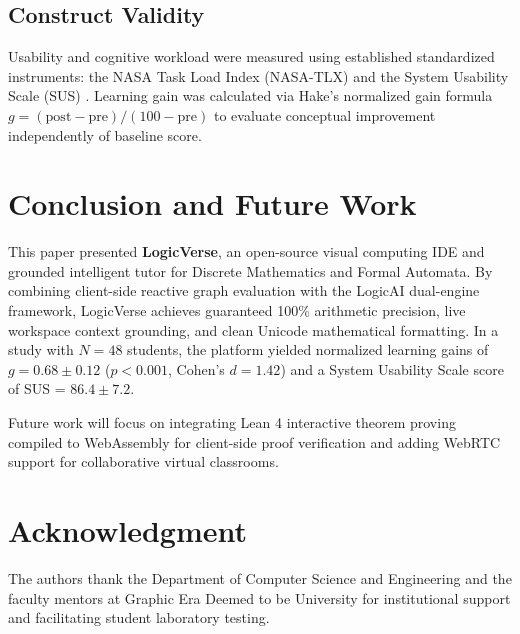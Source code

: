 \documentclass[conference]{IEEEtran}
\begin{document}
\subsection{Construct Validity}
Usability and cognitive workload were measured using established standardized instruments: the NASA Task Load Index (NASA-TLX) \cite{hart1988nasa} and the System Usability Scale (SUS) \cite{brooke1996sus}. Learning gain was calculated via Hake's normalized gain formula $g = (\text{post} - \text{pre}) / (100 - \text{pre})$ to evaluate conceptual improvement independently of baseline score.

\section{Conclusion and Future Work}
This paper presented \textbf{LogicVerse}, an open-source visual computing IDE and grounded intelligent tutor for Discrete Mathematics and Formal Automata. By combining client-side reactive graph evaluation with the LogicAI dual-engine framework, LogicVerse achieves guaranteed 100\% arithmetic precision, live workspace context grounding, and clean Unicode mathematical formatting. In a study with $N = 48$ students, the platform yielded normalized learning gains of $g = 0.68 \pm 0.12$ ($p < 0.001$, Cohen's $d = 1.42$) and a System Usability Scale score of SUS = $86.4 \pm 7.2$.

Future work will focus on integrating Lean 4 interactive theorem proving \cite{demoura2021lean} compiled to WebAssembly for client-side proof verification and adding WebRTC support for collaborative virtual classrooms.

\section*{Acknowledgment}
The authors thank the Department of Computer Science and Engineering and the faculty mentors at Graphic Era Deemed to be University for institutional support and facilitating student laboratory testing.
\end{document}
